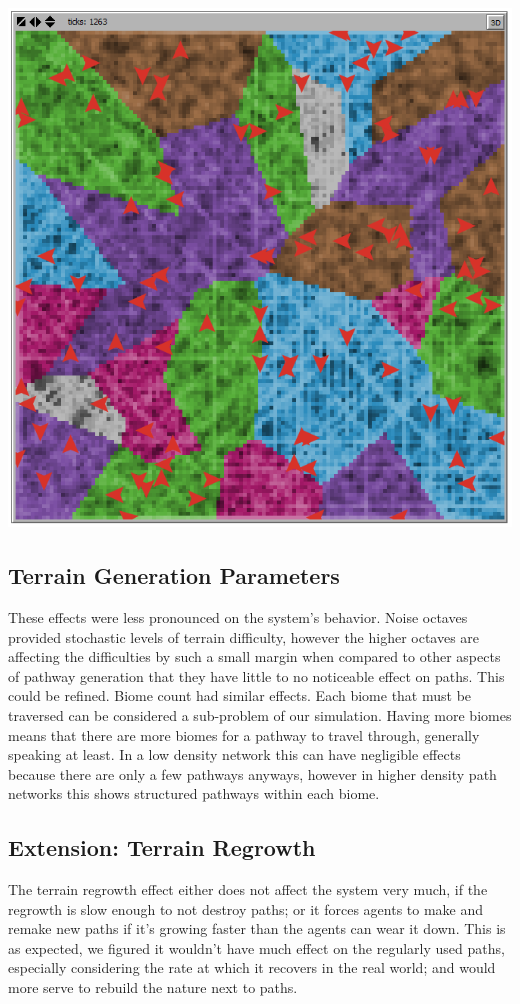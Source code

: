 \documentclass[conference]{IEEEtran}
\begin{document}
\includegraphics[scale=0.25]{image/results6}

\subsection{Terrain Generation Parameters}
These effects were less pronounced on the system's behavior. Noise octaves provided stochastic levels of terrain difficulty, however the higher octaves are affecting the difficulties by such a small margin when compared to other aspects of pathway generation that they have little to no noticeable effect on paths. This could be refined.
Biome count had similar effects. Each biome that must be traversed can be considered a sub-problem of our simulation. Having more biomes means that there are more biomes for a pathway to travel through, generally speaking at least. In a low density network this can have negligible effects because there are only a few pathways anyways, however in higher density path networks this shows structured pathways within each biome. 


\subsection{Extension: Terrain Regrowth}
The terrain regrowth effect either does not affect the system very much, if the regrowth is slow enough to not destroy paths; or it forces agents to make and remake new paths if it's growing faster than the agents can wear it down. This is as expected, we figured it wouldn't have much effect on the regularly used paths, especially considering the rate at which it recovers in the real world; and would more serve to rebuild the nature next to paths. 
\end{document}
